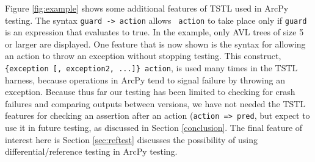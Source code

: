Figure \ref{fig:example} shows some additional features of TSTL used
in ArcPy testing.  The syntax {\tt guard -> action} allows {\tt
  action} to take place only if {\tt guard} is an expression that
evaluates to true.  In the example, only AVL trees of size 5 or larger
are displayed.  One feature that is now shown is the syntax for
allowing an action to throw an exception without stopping
testing. This construct, {\tt \{exception [, exception2, ...]\}
  action}, is used many times in the TSTL harness, because operations
in ArcPy tend to signal failure by throwing an exception.  Because
thus far our testing has been limited to checking for crash failures
and comparing outputs between versions, we have not needed the TSTL
features for checking an assertion after an action ({\tt action =>
  pred}, but expect to use it in future testing, as discussed in
Section \ref{conclusion}.  The final feature of interest here is Section \ref{sec:reftest} discusses the
possibility of using differential/reference testing
\cite{McKeeman,ICSEDiff} in ArcPy testing.  

